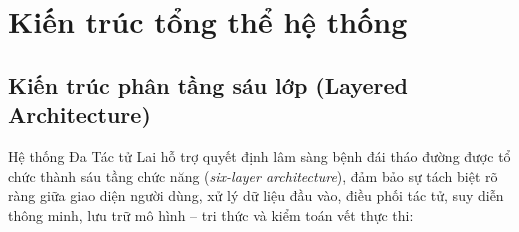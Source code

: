 \chapter{Kiến trúc tổng thể hệ thống}
\label{chap:architecture}

\section{Kiến trúc phân tầng sáu lớp (Layered Architecture)}
\label{sec:layered-architecture}

Hệ thống Đa Tác tử Lai hỗ trợ quyết định lâm sàng bệnh đái tháo đường được tổ chức thành sáu tầng chức năng (\emph{six-layer architecture}), đảm bảo sự tách biệt rõ ràng giữa giao diện người dùng, xử lý dữ liệu đầu vào, điều phối tác tử, suy diễn thông minh, lưu trữ mô hình -- tri thức và kiểm toán vết thực thi:

